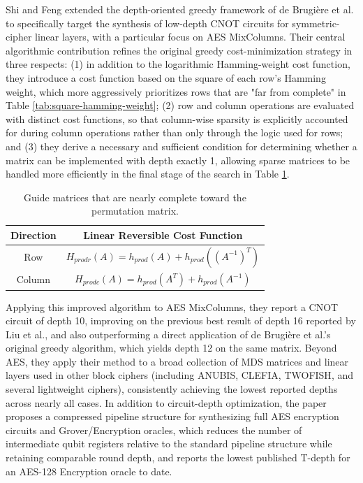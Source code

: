 Shi and Feng \cite{cryptoeprint:2024/381} extended the depth-oriented greedy framework of de Brugière et al. to specifically target the synthesis of low-depth CNOT circuits for symmetric-cipher linear layers, with a particular focus on AES MixColumns. Their central algorithmic contribution refines the original greedy cost-minimization strategy in three respects: (1) in addition to the logarithmic Hamming-weight cost function, they introduce a cost function based on the square of each row's Hamming weight, which more aggressively prioritizes rows that are "far from complete" in Table \ref{tab:square-hamming-weight}; (2) row and column operations are evaluated with distinct cost functions, so that column-wise sparsity is explicitly accounted for during column operations rather than only through the logic used for rows; and (3) they derive a necessary and sufficient condition for determining whether a matrix can be implemented with depth exactly 1, allowing sparse matrices to be handled more efficiently in the final stage of the search in Table \ref{tab:product-hamming-weight}.

\begin{table}[htbp]
\centering
\begin{tabular}{c|c}
\hline
Direction  & Linear Reversible Cost Function\\
\hline
Row & $H_{prodr}(A) = h_{prod}(A) + h_{prod}((A^{-1})^{T})$ \\ 
\hline
Column & $H_{prodc}(A) = h_{prod}(A^{T}) + h_{prod}(A^{-1})$ \\ 
\hline
\end{tabular}
	\caption{Guide matrices that are nearly complete toward the permutation matrix.}
	\label{tab:product-hamming-weight}
\end{table}

Applying this improved algorithm to AES MixColumns, they report a CNOT circuit of depth 10, improving on the previous best result of depth 16 reported by Liu et al.\cite{cryptoeprint:2023/1417}, and also outperforming a direct application of de Brugière et al.'s original greedy algorithm, which yields depth 12 on the same matrix. Beyond AES, they apply their method to a broad collection of MDS matrices and linear layers used in other block ciphers (including ANUBIS\cite{barreto2000anubis}, CLEFIA\cite{shirai2007128}, TWOFISH\cite{schneier1998twofish}, and several lightweight ciphers), consistently achieving the lowest reported depths across nearly all cases. In addition to circuit-depth optimization, the paper proposes a compressed pipeline structure for synthesizing full AES encryption circuits and Grover/Encryption oracles, which reduces the number of intermediate qubit registers relative to the standard pipeline structure while retaining comparable round depth, and reports the lowest published T-depth for an AES-128 Encryption oracle to date.